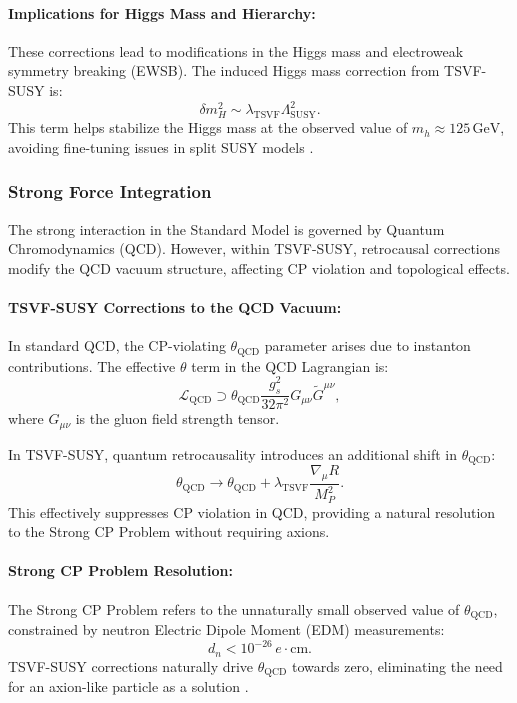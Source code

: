 \documentclass[twocolumn,superscriptaddress,floatfix]{revtex4-2}
\begin{document}
\paragraph{Implications for Higgs Mass and Hierarchy:} 
These corrections lead to modifications in the Higgs mass and electroweak symmetry breaking (EWSB). The induced Higgs mass correction from TSVF-SUSY is:
\begin{equation}
\delta m_H^2 \sim \lambda_{\text{TSVF}} \Lambda_{\text{SUSY}}^2.
\label{eq:higgs_mass_correction}
\end{equation}
This term helps stabilize the Higgs mass at the observed value of \( m_h \approx 125 \, \text{GeV} \), avoiding fine-tuning issues in split SUSY models \cite{ArkaniHamed2005}. 


\subsubsection{Strong Force Integration}
\label{subsec:strong_force}

The strong interaction in the Standard Model is governed by Quantum Chromodynamics (QCD). However, within TSVF-SUSY, retrocausal corrections modify the QCD vacuum structure, affecting CP violation and topological effects.

\paragraph{TSVF-SUSY Corrections to the QCD Vacuum:}
In standard QCD, the CP-violating $\theta_{\text{QCD}}$ parameter arises due to instanton contributions. The effective $\theta$ term in the QCD Lagrangian is:
\begin{equation}
\mathcal{L}_{\text{QCD}} \supset \theta_{\text{QCD}} \frac{g_s^2}{32\pi^2} G_{\mu\nu} \tilde{G}^{\mu\nu},
\end{equation}
where $G_{\mu\nu}$ is the gluon field strength tensor.

In TSVF-SUSY, quantum retrocausality introduces an additional shift in $\theta_{\text{QCD}}$:
\begin{equation}  
\theta_{\text{QCD}} \to \theta_{\text{QCD}} + \lambda_{\text{TSVF}} \frac{\nabla_\mu R}{M_P^2}.  
\label{eq:theta_qcd_tsvf}
\end{equation}
This effectively suppresses CP violation in QCD, providing a natural resolution to the Strong CP Problem without requiring axions.

\paragraph{Strong CP Problem Resolution:}
The Strong CP Problem refers to the unnaturally small observed value of $\theta_{\text{QCD}}$, constrained by neutron Electric Dipole Moment (EDM) measurements:
\begin{equation}
d_n < 10^{-26} \, e \cdot \text{cm}.
\end{equation}
TSVF-SUSY corrections naturally drive $\theta_{\text{QCD}}$ towards zero, eliminating the need for an axion-like particle as a solution \cite{Peccei1977}.
\end{document}

